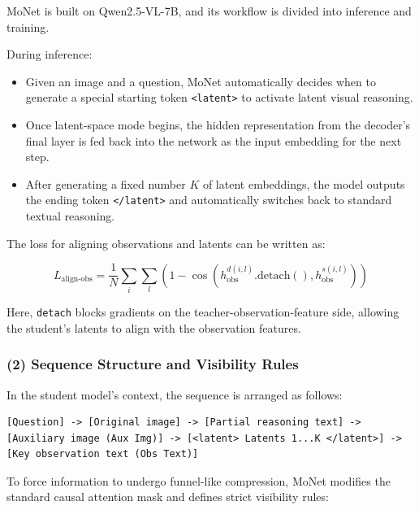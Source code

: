 MoNet is built on Qwen2.5-VL-7B, and its workflow is divided into inference and training.

During inference:

\begin{itemize}
\tightlist
\item
  Given an image and a question, MoNet automatically decides when to generate a special starting token \texttt{\textless{}latent\textgreater{}} to activate latent visual reasoning.
\item
  Once latent-space mode begins, the hidden representation from the decoder's final layer is fed back into the network as the input embedding for the next step.
\item
  After generating a fixed number \(K\) of latent embeddings, the model outputs the ending token \texttt{\textless{}/latent\textgreater{}} and automatically switches back to standard textual reasoning.
\end{itemize}

The loss for aligning observations and latents can be written as:

\[
L_{\text{align-obs}}
=\frac{1}{N}\sum_i\sum_l
\left(
1-\cos\left(h_{\text{obs}}^{d(i,l)}.\mathrm{detach}(),h_{\text{obs}}^{s(i,l)}\right)
\right)
\]

Here, \texttt{detach} blocks gradients on the teacher-observation-feature side, allowing the student's latents to align with the observation features.

\hypertarget{sequence-structure-and-visibility-rules}{%
\subsubsection{(2) Sequence Structure and Visibility Rules}\label{sequence-structure-and-visibility-rules}}

In the student model's context, the sequence is arranged as follows:

\begin{verbatim}
[Question] -> [Original image] -> [Partial reasoning text] -> [Auxiliary image (Aux Img)] -> [<latent> Latents 1...K </latent>] -> [Key observation text (Obs Text)]
\end{verbatim}

To force information to undergo funnel-like compression, MoNet modifies the standard causal attention mask and defines strict visibility rules:

